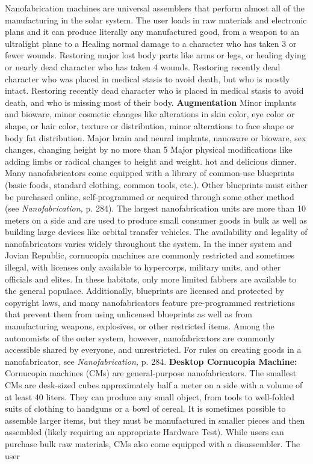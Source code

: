 Nanofabrication machines are universal assemblers 
that perform almost all of the manufacturing in the 
solar system. The user loads in raw materials and electronic
plans and it can produce literally any manufactured
good, from a weapon to an ultralight plane to a
Healing normal damage to a character who has taken 3 or fewer wounds. 
Restoring major lost body parts like arms or legs, or healing dying or nearly dead character 
who has taken 4 wounds. 
Restoring recently dead character who was placed in medical stasis to avoid death, but 
who is mostly intact.
Restoring recently dead character who is placed in medical stasis to avoid death,
and who is missing most of their body.
\textbf{Augmentation}
Minor implants and bioware, minor cosmetic changes like alterations in skin color, eye 
color or shape, or hair color, texture or distribution, minor alterations to face shape or 
body fat distribution.
Major brain and neural implants, nanoware or bioware, sex changes, changing height by 
no more than 5%
Major physical modifications like adding limbs or radical changes to height and weight.
hot and delicious dinner. Many nanofabricators come 
equipped with a library of common-use blueprints 
(basic foods, standard clothing, common tools, etc.). 
Other blueprints must either be purchased online, self-programmed
or acquired through some other method
(see \textit{Nanofabrication,} p. 284). The largest nanofabrication
units are more than 10 meters on a side and are
used to produce small consumer goods in bulk as well 
as building large devices like orbital transfer vehicles.
The availability and legality of nanofabricators 
varies widely throughout the system. In the inner 
system and Jovian Republic, cornucopia machines 
are commonly restricted and sometimes illegal, with 
licenses only available to hypercorps, military units, 
and other officials and elites. In these habitats, only 
more limited fabbers are available to the general 
populace. Additionally, blueprints are licensed and 
protected by copyright laws, and many nanofabricators
feature pre-programmed restrictions that prevent
them from using unlicensed blueprints as well as 
from manufacturing weapons, explosives, or other 
restricted items. Among the autonomists of the outer 
system, however, nanofabricators are commonly accessible
shared by everyone, and unrestricted.
For rules on creating goods in a nanofabricator, see 
\textit{Nanofabrication,} p. 284.
\textbf{Desktop Cornucopia Machine:} Cornucopia machines
(CMs) are general-purpose nanofabricators.
The smallest CMs are desk-sized cubes approximately 
half a meter on a side with a volume of at least 40 
liters. They can produce any small object, from tools 
to well-folded suits of clothing to handguns or a bowl 
of cereal. It is sometimes possible to assemble larger 
items, but they must be manufactured in smaller 
pieces and then assembled (likely requiring an appropriate
Hardware Test).
While users can purchase bulk raw materials, CMs 
also come equipped with a disassembler. The user 

